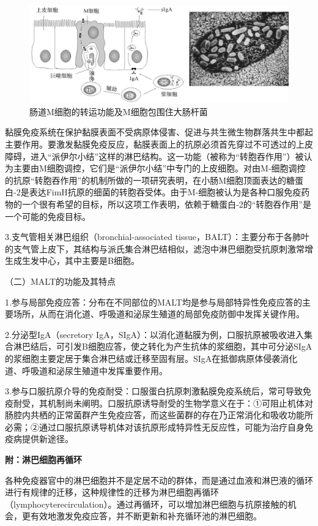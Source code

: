 \begin{figure}[!htbp]
 \centering
 \includegraphics[width=.6\textwidth]{./images/Image00036.jpg}
 \caption{肠道M细胞的转运功能及M细胞包围住大肠杆菌}
 \label{fig2-11}
  \end{figure} 

黏膜免疫系统在保护黏膜表面不受病原体侵害、促进与共生微生物群落共生中都起主要作用。要激发黏膜免疫反应，黏膜表面上的抗原必须首先穿过不可透过的上皮障碍，进入“派伊尔小结”这样的淋巴结构。这一功能（被称为“转胞吞作用”）被认为主要由M细胞调控，它们是“派伊尔小结”中专门的上皮细胞。对由M-细胞调控的抗原“转胞吞作用”的机制所做的一项研究表明，在小肠M细胞顶面表达的糖蛋白-2是表达FimH抗原的细菌的转胞吞受体。由于M-细胞被认为是各种口服免疫药物的一个很有希望的目标，所以这项工作表明，依赖于糖蛋白-2的“转胞吞作用”是一个可能的免疫目标。

3.支气管相关淋巴组织（bronchial-associated
tissue，BALT）：主要分布于各肺叶的支气管上皮下，其结构与派氏集合淋巴结相似，滤泡中淋巴细胞受抗原刺激常增生成生发中心，其中主要是B细胞。

（二）MALT的功能及其特点

1.参与局部免疫应答：分布在不同部位的MALT均是参与局部特异性免疫应答的主要场所，从而在消化道、呼吸道和泌尿生殖道的局部免疫防御中发挥关键作用。

2.分泌型IgA（secretory
IgA，SIgA）：以消化道黏膜为例，口服抗原被吸收进入集合淋巴结后，可引发B细胞应答，使之转化为产生抗体的浆细胞，其中可分泌SIgA的浆细胞主要定居于集合淋巴结或迁移至固有层。SIgA在抵御病原体侵袭消化道、呼吸道和泌尿生殖道中发挥重要作用。

3.参与口服抗原介导的免疫耐受：口服蛋白抗原刺激黏膜免疫系统后，常可导致免疫耐受，其机制尚未阐明。口服抗原诱导耐受的生物学意义在于：①可阻止机体对肠腔内共栖的正常菌群产生免疫应答，而这些菌群的存在乃正常消化和吸收功能所必需；②通过口服抗原诱导机体对该抗原形成特异性无反应性，可能为治疗自身免疫病提供新途径。

\begin{center}
\textbf{\Large 附：淋巴细胞再循环}
\end{center}

各种免疫器官中的淋巴细胞并不是定居不动的群体，而是通过血液和淋巴液的循环进行有规律的迁移，这种规律性的迁移为淋巴细胞再循环（lymphocyterecirculation）。通过再循环，可以增加淋巴细胞与抗原接触的机会，更有效地激发免疫应答，并不断更新和补充循环池的淋巴细胞。

